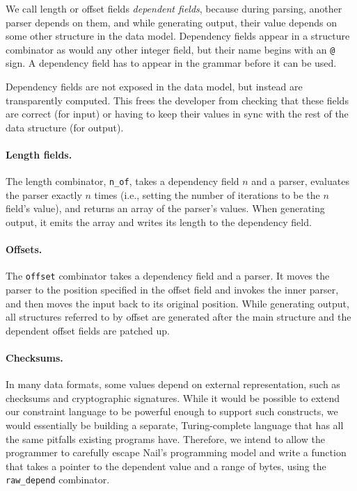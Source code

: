We call length or offset fields \textit{dependent fields}, because during
parsing, another parser depends on them, and while generating output, their
value depends on some other structure in the data model. Dependency fields
appear in a structure combinator as would any other integer field, but
their name begins with an \texttt{@} sign.  A dependency field has to
appear in the grammar before it can be used.

Dependency fields are not exposed in the data model, but instead are
transparently computed.  This frees the developer from checking that
these fields are correct (for input) or having to keep their values in
sync with the rest of the data structure (for output).

\paragraph{Length fields.}

The length combinator, \texttt{n_of}, takes a dependency field $n$
and a parser, evaluates the parser exactly $n$ times (i.e., setting
the number of iterations to be the $n$ field's value), and returns
an array of the parser's values. When generating output, it emits
the array and writes its length to the dependency field.

\paragraph{Offsets.}

The \texttt{offset} combinator takes a dependency field and a parser. It
moves the parser to the position specified in the offset field and
invokes the inner parser, and then moves the input back to its original
position.  While generating output, all structures referred to by offset
are generated after the main structure and the dependent offset fields
are patched up.

\paragraph{Checksums.}

In many data formats, some values depend on external representation,
such as checksums and cryptographic signatures.  While it would be
possible to extend our constraint language to be powerful enough to
support such constructs, we would essentially be building a separate,
Turing-complete language that has all the same pitfalls existing programs
have.  Therefore, we intend to allow the programmer to carefully escape
Nail's programming model and write a function that takes a pointer to
the dependent value and a range of bytes, using the \texttt{raw_depend}
combinator.

